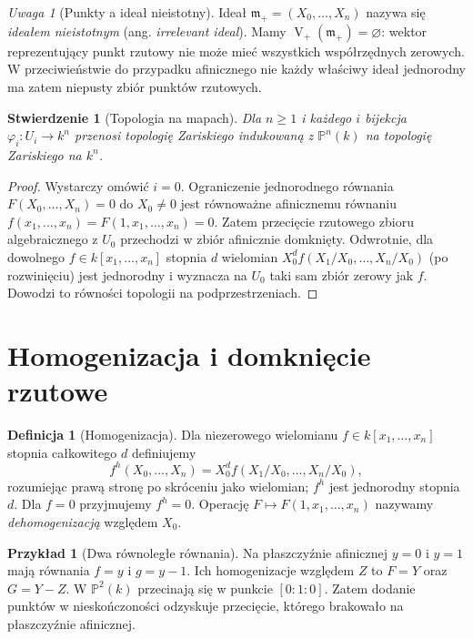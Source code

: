\documentclass[11pt,a4paper,openany]{report}
\numberwithin{equation}{section}
\theoremstyle{plain}
\newtheorem{stwierdzenie}[twierdzenie]{Stwierdzenie}
\theoremstyle{definition}
\newtheorem{definicja}[twierdzenie]{Definicja}
\newtheorem{przyklad}[twierdzenie]{Przykład}
\theoremstyle{remark}
\newtheorem{uwaga}[twierdzenie]{Uwaga}
\newcommand{\PP}{\mathbb P}
\newcommand{\V}{\operatorname V}
\begin{document}
\begin{uwaga}[Punkty a ideał nieistotny]
Ideał $\mathfrak m_+=(X_0,\dots,X_n)$ nazywa się
\emph{ideałem nieistotnym} (ang. \emph{irrelevant ideal}).
Mamy $\V_+(\mathfrak m_+)=\varnothing$: wektor reprezentujący
punkt rzutowy nie może mieć wszystkich współrzędnych zerowych.
W przeciwieństwie do przypadku afinicznego nie każdy właściwy
ideał jednorodny ma zatem niepusty zbiór punktów rzutowych.
\end{uwaga}

\begin{stwierdzenie}[Topologia na mapach]
Dla $n\ge1$ i każdego $i$ bijekcja $\varphi_i:U_i\to k^n$
przenosi topologię Zariskiego indukowaną z $\PP^n(k)$
na topologię Zariskiego na $k^n$.
\end{stwierdzenie}
\begin{proof}
Wystarczy omówić $i=0$. Ograniczenie jednorodnego równania
$F(X_0,\dots,X_n)=0$ do $X_0\ne0$ jest równoważne
afinicznemu równaniu $f(x_1,\dots,x_n)=F(1,x_1,\dots,x_n)=0$.
Zatem przecięcie rzutowego zbioru algebraicznego z $U_0$
przechodzi w zbiór afinicznie domknięty. Odwrotnie,
dla dowolnego $f\in k[x_1,\dots,x_n]$ stopnia $d$
wielomian $X_0^df(X_1/X_0,\dots,X_n/X_0)$
(po rozwinięciu) jest jednorodny i wyznacza na $U_0$
taki sam zbiór zerowy jak $f$. Dowodzi to równości
topologii na podprzestrzeniach.
\end{proof}

\section{Homogenizacja i domknięcie rzutowe}

\begin{definicja}[Homogenizacja]
Dla niezerowego wielomianu $f\in k[x_1,\ldots,x_n]$
stopnia całkowitego $d$ definiujemy
\[
 f^h(X_0,\ldots,X_n)
 =X_0^d f(X_1/X_0,\ldots,X_n/X_0),
\]
rozumiejąc prawą stronę po skróceniu jako wielomian;
$f^h$ jest jednorodny stopnia $d$. Dla $f=0$ przyjmujemy
$f^h=0$. Operację $F\mapsto F(1,x_1,\ldots,x_n)$
nazywamy \emph{dehomogenizacją} względem $X_0$.
\end{definicja}

\begin{przyklad}[Dwa równoległe równania]
Na płaszczyźnie afinicznej $y=0$ i $y=1$ mają równania
$f=y$ i $g=y-1$. Ich homogenizacje względem $Z$ to
$F=Y$ oraz $G=Y-Z$.
W $\PP^2(k)$ przecinają się w punkcie $[0:1:0]$.
Zatem dodanie punktów w nieskończoności odzyskuje
przecięcie, którego brakowało na płaszczyźnie afinicznej.
\end{przyklad}
\end{document}
